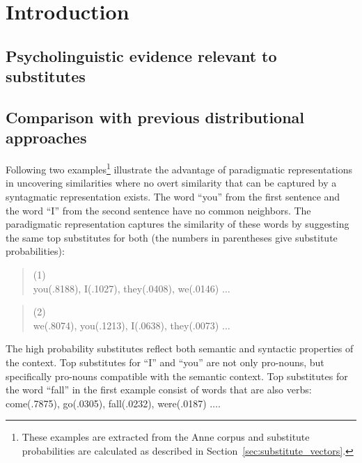 \section{Introduction}
\label{sec:introduction}
\subsection{Psycholinguistic evidence relevant to substitutes}

\subsection{Comparison with previous distributional approaches}

Following two examples\footnote{These examples are extracted from the Anne
corpus and substitute probabilities are calculated as described in
Section~\ref{sec:substitute_vectors}.} illustrate the advantage of paradigmatic
representations in uncovering similarities where no overt similarity that can
be captured by a syntagmatic representation exists. The word ``you'' from the
first sentence and the word ``I'' from the second sentence have no common
neighbors.  The paradigmatic representation captures the similarity of these
words by suggesting the same top substitutes for both (the numbers in
parentheses give substitute probabilities): 

\begin{quote}
  \small
  (1) \\
   you(.8188), I(.1027), they(.0408), we(.0146) $\ldots$
\end{quote}

\begin{quote}
  \small
  (2) \\
   we(.8074), you(.1213), I(.0638), they(.0073) $\ldots$
\end{quote}

The high probability substitutes reflect both semantic and syntactic properties
of the context.  Top substitutes for ``I'' and ``you'' are not only pro-nouns, but
specifically pro-nouns compatible with the semantic context.  Top substitutes for
the word ``fall'' in the first example consist of words that are also  verbs:
come(.7875), go(.0305), fall(.0232), were(.0187) $\ldots$.


